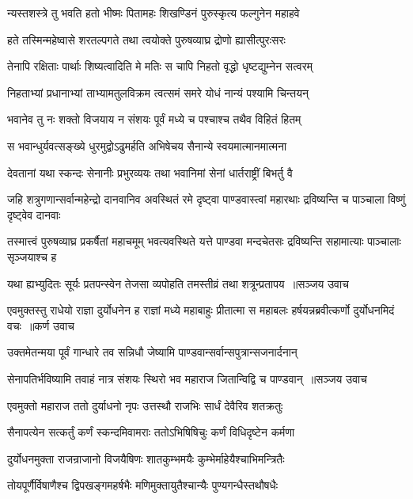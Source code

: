 \twolineshloka
{न्यस्तशस्त्रे तु भवति हतो भीष्मः पितामहः}
{शिखण्डिनं पुरुस्कृत्य फल्गुनेन महाहवे}


\twolineshloka
{हते तस्मिन्महेष्वासे शरतल्पगते तथा}
{त्वयोक्ते पुरुषव्याघ्र द्रोणो ह्यासीत्पुरःसरः}


\twolineshloka
{तेनापि रक्षिताः पार्थाः शिष्यत्वादिति मे मतिः}
{स चापि निहतो वृद्धो धृष्टद्युम्नेन सत्वरम्}


\twolineshloka
{निहताभ्यां प्रधानाभ्यां ताभ्यामतुलविक्रम}
{त्वत्समं समरे योधं नान्यं पश्यामि चिन्तयन्}


\twolineshloka
{भवानेव तु नः शक्तो विजयाय न संशयः}
{पूर्वं मध्ये च पश्चाश्च तथैव विहितं हितम्}


\twolineshloka
{स भवान्धुर्यवत्सङ्ख्ये धुरमुद्वोऽढुमर्हति}
{अभिषेचय सैनान्ये स्वयमात्मानमात्मना}


\twolineshloka
{देवतानां यथा स्कन्दः सेनानीः प्रभुरव्ययः}
{तथा भवानिमां सेनां धार्तराष्ट्रीं बिभर्तु वै}


\threelineshloka
{जहि शत्रुगणान्सर्वान्महेन्द्रो दानवानिव}
{अवस्थितं रमे दृष्ट्वा पाण्डवास्त्वां महारथाः}
{द्रविष्यन्ति च पाञ्चाला विष्णुं दृष्ट्वेव दानवाः}


तस्मात्त्वं पुरुषव्याघ्र प्रकर्षैतां महाचमूम्
\threelineshloka
{भवत्यवस्थिते यत्ते पाण्डवा मन्दचेतसः}
{द्रविष्यन्ति सहामात्याः पाञ्चालाः सृञ्जयाश्च ह}
{}


\threelineshloka
{यथा ह्यभ्युदितः सूर्यः प्रतपन्स्वेन तेजसा}
{व्यपोहति तमस्तीव्रं तथा शत्रून्प्रतापय ॥सञ्जय उवाच}
{}


\fourlineindentedshloka
{एवमुक्तस्तु राधेयो राज्ञा दुर्योधनेन ह}
{राज्ञां मध्ये महाबाहुः प्रीतात्मा स महाबलः}
{हर्षयन्नब्रवीत्कर्णो दुर्योधनमिदं वचः ॥कर्ण उवाच}
{}


\twolineshloka
{उक्तमेतन्मया पूर्वं गान्धारे तव सन्निधौ}
{जेष्यामि पाण्डवान्सर्वान्सपुत्रान्सजनार्दनान्}


\threelineshloka
{सेनापतिर्भविष्यामि तवाहं नात्र संशयः}
{स्थिरो भव महाराज जितान्विद्वि च पाण्डवान् ॥सञ्जय उवाच}
{}


\twolineshloka
{एवमुक्तो महाराज ततो दुर्याधनो नृपः}
{उत्तस्थौ राजभिः सार्धं देवैरिव शतक्रतुः}


\twolineshloka
{सैनापत्येन सत्कर्तुं कर्णं स्कन्दमिवामराः}
{ततोऽभिषिषिचुः कर्णं विधिदृष्टेन कर्मणा}


\twolineshloka
{दुर्योधनमुक्ता राजन्राजानो विजयैषिणः}
{शातकुम्भमयैः कुम्भेर्माहेयैश्चाभिमन्त्रितैः}


\twolineshloka
{तोयपूर्णैर्विषाणैश्च द्विपखङ्गमहर्षभैः}
{मणिमुक्तायुतैश्चान्यैः पुण्यगन्धैस्तथौषधैः}



